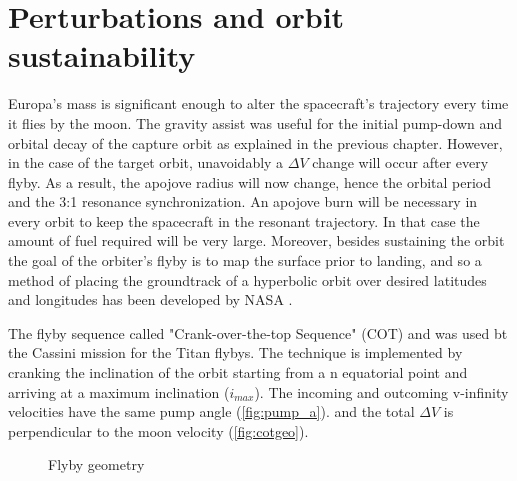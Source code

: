 \section{Perturbations and orbit sustainability}
Europa's mass is significant enough to alter the spacecraft's trajectory every time it flies by the moon. The gravity assist was useful for the initial pump-down and orbital decay of the capture orbit as explained in the previous chapter. However, in the case of the target orbit, unavoidably a $\Delta V$ change will occur after every flyby. As a result, the apojove radius will now change, hence the orbital period and the 3:1 resonance synchronization. An apojove burn will be necessary in every orbit to keep the spacecraft in the resonant trajectory. In that case the amount of fuel required will be very large. Moreover, besides sustaining the orbit the goal of the orbiter's flyby is to map the surface prior to landing, and so a method of placing the groundtrack of a hyperbolic orbit over desired latitudes and longitudes has been developed by NASA \cite{cotseq}. 

The flyby sequence called "Crank-over-the-top Sequence" (COT) and was used bt the Cassini mission for the Titan flybys. The technique is implemented by cranking the inclination of the orbit starting from a n equatorial point and arriving at a maximum inclination ($i_{max}$). The incoming and outcoming v-infinity velocities have the same pump angle (\ref{fig:pump_a}).
and the total $\Delta V$ is perpendicular to the moon velocity (\ref{fig:cotgeo}). 

\begin{figure}[htb!]
    \centering
    \captionsetup[subfigure]{width=0.45\textwidth}
    \caption{Flyby geometry}
\end{figure}

